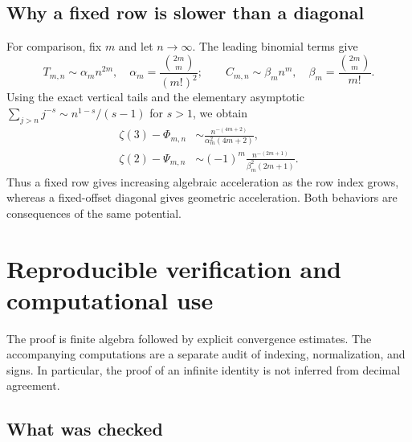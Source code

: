 \documentclass[11pt,letterpaper]{article}
\numberwithin{equation}{section}
\theoremstyle{definition}
\newcommand{\zthree}{\zeta(3)}
\newcommand{\ztwo}{\zeta(2)}
\begin{document}
\subsection{Why a fixed row is slower than a diagonal}

For comparison, fix $m$ and let $n\to\infty$. The leading binomial
terms give
\[
 T_{m,n}\sim\alpha_m n^{2m},\quad
 \alpha_m=\frac{\binom{2m}{m}}{(m!)^2};
 \qquad
 C_{m,n}\sim\beta_m n^m,\quad
 \beta_m=\frac{\binom{2m}{m}}{m!}.
\]
Using the exact vertical tails and the elementary asymptotic
$\sum_{j>n}j^{-s}\sim n^{1-s}/(s-1)$ for $s>1$, we obtain
\begin{align}
 \zthree-\Phi_{m,n}&\sim
 \frac{n^{-(4m+2)}}{\alpha_m^2(4m+2)},\label{eq:rowasymp3}\\
 \ztwo-\Psi_{m,n}&\sim(-1)^m
 \frac{n^{-(2m+1)}}{\beta_m^2(2m+1)}.\label{eq:rowasymp2}
\end{align}
Thus a fixed row gives increasing algebraic acceleration as the row
index grows, whereas a fixed-offset diagonal gives geometric
acceleration. Both behaviors are consequences of the same potential.

\section{Reproducible verification and computational use}\label{sec:verification}

The proof is finite algebra followed by explicit convergence estimates.
The accompanying computations are a separate audit of indexing,
normalization, and signs. In particular, the proof of an infinite
identity is not inferred from decimal agreement.

\subsection{What was checked}
\end{document}
